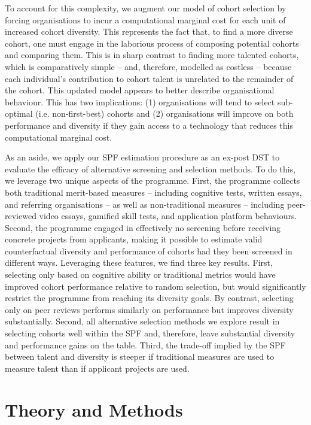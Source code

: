 To account for this complexity, we augment our model of cohort selection by forcing organisations to incur a computational marginal cost for each unit of increased cohort diversity. This represents the fact that, to find a more diverse cohort, one must engage in the laborious process of composing potential cohorts and comparing them. This is in sharp contrast to finding more talented cohorts, which is comparatively simple -- and, therefore, modelled as costless -- because each individual's contribution to cohort talent is unrelated to the remainder of the cohort. This updated model appears to better describe organisational behaviour. This has two implications: (1) organisations will tend to select sub-optimal (i.e. non-first-best) cohorts and (2) organisations will improve on both performance and diversity if they gain access to a technology that reduces this computational marginal cost. 

As an aside, we apply our SPF estimation procedure as an ex-post DST to evaluate the efficacy of alternative screening and selection methods. To do this, we leverage two unique aspects of the programme. First, the programme collects both traditional merit-based measures -- including cognitive tests, written essays, and referring organisations -- as well as non-traditional measures -- including peer-reviewed video essays, gamified skill tests, and application platform behaviours. Second, the programme engaged in effectively no screening before receiving concrete projects from applicants, making it possible to estimate valid counterfactual diversity and performance of cohorts had they been screened in different ways. Leveraging these features, we find three key results. First, selecting only based on cognitive ability or traditional metrics would have improved cohort performance relative to random selection, but would significantly restrict the programme from reaching its diversity goals. By contrast, selecting only on peer reviews performs similarly on performance but improves diversity substantially. Second, all alternative selection methods we explore result in selecting cohorts well within the SPF and, therefore, leave substantial diversity and performance gains on the table. Third, the trade-off implied by the SPF between talent and diversity is steeper if traditional measures are used to measure talent than if applicant projects are used. 

\section{Theory and Methods}\label{sec:spfmethod}
